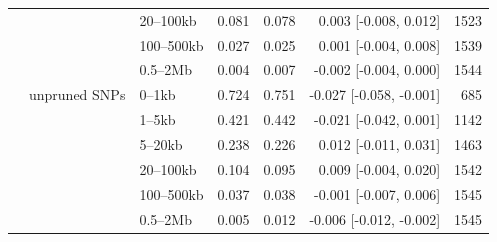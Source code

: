 \begin{table}[htbp]
{\begin{tabular}{lllrrrr}
 &  & 20--100kb & 0.081 & 0.078 & 0.003 [-0.008, 0.012] & 1523 \\
 &  & 100--500kb & 0.027 & 0.025 & 0.001 [-0.004, 0.008] & 1539 \\
 &  & 0.5--2Mb & 0.004 & 0.007 & -0.002 [-0.004, 0.000] & 1544 \\
 & unpruned SNPs & 0--1kb & 0.724 & 0.751 & -0.027 [-0.058, -0.001] & 685 \\
 &  & 1--5kb & 0.421 & 0.442 & -0.021 [-0.042, 0.001] & 1142 \\
 &  & 5--20kb & 0.238 & 0.226 & 0.012 [-0.011, 0.031] & 1463 \\
 &  & 20--100kb & 0.104 & 0.095 & 0.009 [-0.004, 0.020] & 1542 \\
 &  & 100--500kb & 0.037 & 0.038 & -0.001 [-0.007, 0.006] & 1545 \\
 &  & 0.5--2Mb & 0.005 & 0.012 & -0.006 [-0.012, -0.002] & 1545 \\
\bottomrule
\end{tabular}}
\end{table}
